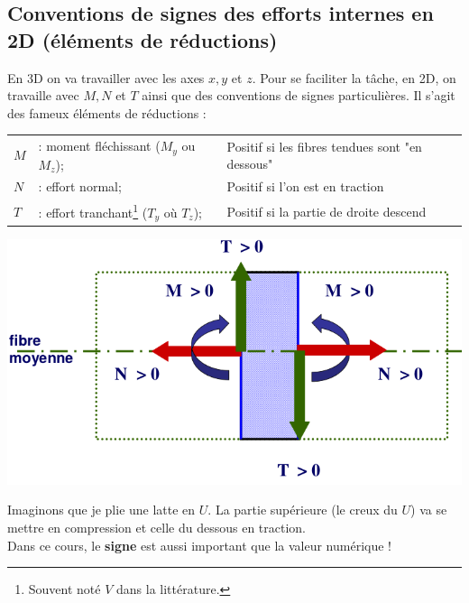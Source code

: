 	\subsection{Conventions de signes des efforts internes en 2D 
	(éléments de réductions)}
	En 3D on va travailler avec les axes $x,y$ et $z$. Pour se 
	faciliter la tâche, en 2D, on travaille avec $M,N$ et $T$ ainsi 
	que des conventions de signes particulières. Il s'agit des 
	fameux éléments de réductions :\\
	\begin{tabular}{lll}
	$M$ &: moment fléchissant ($M_y$ ou $M_z$); & Positif si les fibres 
	tendues sont "en dessous"\\
	$N$ &: effort normal; & Positif si l'on est en traction\\
	$T$ &: effort tranchant\footnote{Souvent noté $V$ dans la littérature.} 
	($T_y$ où $T_z$); & Positif si la partie de droite descend
	\end{tabular}
	\begin{center}
	\includegraphics[scale=0.45]{ch2/image7}
	\end{center}

	Imaginons que  je plie une latte en $U$. La partie supérieure (le 
	creux du $U$) va se mettre en compression et celle du dessous en 
	traction.\\
	\danger Dans ce cours, le \textbf{signe} est aussi important que la 
	valeur numérique !
	
